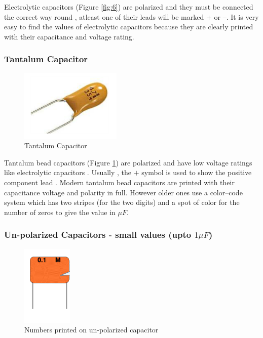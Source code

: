 			Electrolytic capacitors (Figure \ref{fig:6}) are polarized and they must be connected the correct way round , atleast one of their leads will be marked $+$ or $–$. It is very easy to find the values of electrolytic capacitors because they are clearly printed with their capacitance and voltage rating.
			
		\subsubsection{Tantalum Capacitor}
			\begin{figure}[h]
				\centering
				\includegraphics[width=0.5\linewidth]{img/exp2/6}
				\caption{Tantalum Capacitor}
				\label{fig:7}
			\end{figure}
		
			Tantalum bead capacitors (Figure \ref{fig:7}) are polarized and have low voltage ratings like electrolytic capacitors . Usually , the $+$ symbol is used to show the positive component lead . Modern tantalum bead capacitors are printed with their capacitance voltage and polarity in full. However older ones use a color–code system which has two stripes (for the two digits) and a spot of color for the number of zeros to give the value in $\mu F$.
			
		\subsubsection{Un-polarized Capacitors - small values (upto $1\mu F$)}
			\begin{figure}[h]
				\centering
				\includegraphics[width=0.2\linewidth]{img/exp2/7}
				\caption{Numbers printed on un-polarized capacitor}
				\label{fig:8}
			\end{figure}
			
